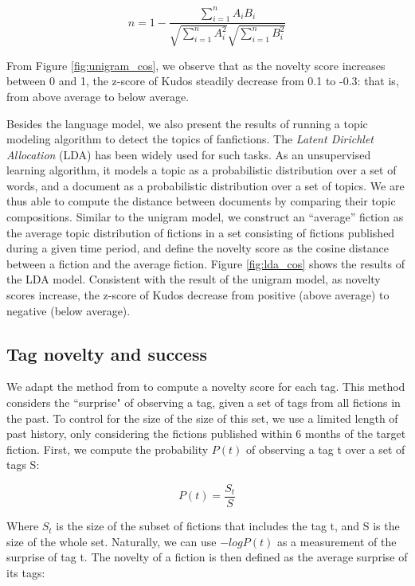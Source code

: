 \documentclass[a4paper]{article}
\begin{document}
\begin{equation}
n = 1-\frac{\sum_{i=1}^{n}{A_iB_i}}{\sqrt{\sum_{i=1}^{n}{A_i^2}}\sqrt{\sum_{i=1}^{n}{B_i^2}}}
\end{equation}

From Figure \ref{fig:unigram_cos}, we observe that as the novelty score increases between 0 and 1, the z-score of Kudos steadily decrease from 0.1 to -0.3: that is, from above average to below average. 

Besides the language model, we also present the results of running a topic modeling algorithm to detect the topics of fanfictions. 
The \emph{Latent Dirichlet Allocation} (LDA) \cite{blei2003latent} has been widely used for such tasks. As an unsupervised learning algorithm, it models a topic as a probabilistic distribution over a set of words, and a document as a probabilistic distribution over a set of topics. We are thus able to compute the distance between documents by comparing their topic compositions. Similar to the unigram model, we construct an ``average'' fiction as the average topic distribution of fictions in a set consisting of fictions published during a given time period, and define the novelty score as the cosine distance between a fiction and the average fiction. Figure \ref{fig:lda_cos} shows the results of the LDA model. Consistent with the result of the unigram model, as novelty scores increase, the z-score of Kudos decrease from positive (above average) to negative (below average).

\subsection*{Tag novelty and success}
We adapt the method from \cite{sreenivasan2013quantitative} to compute a novelty score for each tag. This method considers the ``surprise" of observing a tag, given a set of tags from all fictions in the past. To control for the size of the size of this set, we use a limited length of past history, only considering the fictions published within 6 months of the target fiction. First, we compute the probability $P(t)$ of observing a tag t over a set of tags S:

\begin{equation}
P(t) = \frac{S_t}{S}
\end{equation}

Where $S_t$ is the size of the subset of fictions that includes the tag t, and S is the size of the whole set. Naturally, we can use $-logP(t)$ as a measurement of the surprise of tag t. The novelty of a fiction is then defined as the average surprise of its tags:
\end{document}
